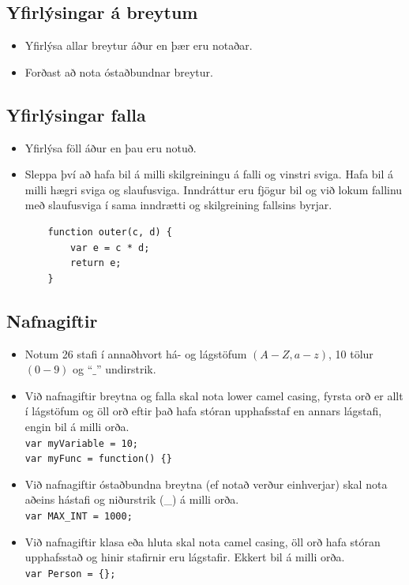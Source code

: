 \documentclass{article}
\theoremstyle{blueP}
\theoremstyle{greenS}
\begin{document}
\subsection{Yfirlýsingar á breytum}
\begin{itemize}
    \item Yfirlýsa allar breytur áður en þær eru notaðar.
    \item Forðast að nota óstaðbundnar breytur.
\end{itemize}

\subsection{Yfirlýsingar falla}
\begin{itemize}
    \item Yfirlýsa föll áður en þau eru notuð.
    \item Sleppa því að hafa bil á milli skilgreiningu á falli og vinstri sviga. Hafa bil á milli hægri sviga og slaufusviga. Inndráttur eru fjögur bil og við lokum fallinu með slaufusviga í sama inndrætti og skilgreining fallsins byrjar. \\
    \begin{lstlisting}
    function outer(c, d) {
        var e = c * d;
        return e;
    }\end{lstlisting}
\end{itemize}

\subsection{Nafnagiftir}
\begin{itemize}
    \item Notum 26 stafi í annaðhvort há- og lágstöfum $(A - Z, a -z)$, 10 tölur $(0 - 9)$ og “$\_$” undirstrik.
    \item Við nafnagiftir breytna og falla skal nota lower camel casing, fyrsta orð er allt í lágstöfum og öll orð eftir það hafa stóran upphafsstaf en annars lágstafi, engin bil á milli orða. \\
    \lstinline|var myVariable = 10;| \\
    \lstinline|var myFunc = function() {}|
    \item Við nafnagiftir óstaðbundna breytna (ef notað verður einhverjar) skal nota aðeins hástafi og niðurstrik (\_) á milli orða. \\ 
    \lstinline|var MAX_INT = 1000;|
    \item Við nafnagiftir klasa eða hluta skal nota camel casing, öll orð hafa stóran upphafsstað og hinir stafirnir eru lágstafir. Ekkert bil á milli orða. \\
    \lstinline|var Person = {};|
\end{itemize}
\end{document}
